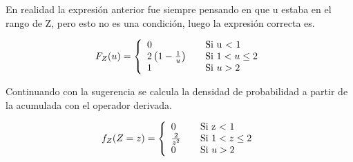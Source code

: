 		En realidad la expresión anterior fue siempre pensando en que u estaba en el rango de Z, pero esto no es una condición, luego la expresión correcta es.

		\begin{equation}
			F_Z(u) = \left\{
			  \begin{array}{l l}
			    0 & \quad \text{Si u $<$ 1}\\
			    2\left(1-\frac{1}{u}\right) & \quad \text{Si $1<u\leq2$}\\
			    1 & \quad \text{Si $u>2$}
			  \end{array} \right.
		\end{equation}

		Continuando con la sugerencia se calcula la densidad de probabilidad a partir de la acumulada con el operador derivada.

		\begin{equation}
			f_Z(Z=z) = \left\{
			  \begin{array}{l l}
			    0 & \quad \text{Si z $<$ 1}\\
			    \frac{2}{z^2} & \quad \text{Si $1<z\leq2$}\\
			    0 & \quad \text{Si $u>2$}
			  \end{array} \right.
		\end{equation}